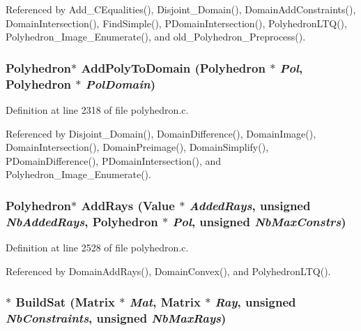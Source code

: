 Referenced by Add\_\-CEqualities(), Disjoint\_\-Domain(), Domain\-Add\-Constraints(), Domain\-Intersection(), Find\-Simple(), PDomain\-Intersection(), Polyhedron\-LTQ(), Polyhedron\_\-Image\_\-Enumerate(), and old\_\-Polyhedron\_\-Preprocess().

\subsubsection{\setlength{\rightskip}{0pt plus 5cm}Polyhedron$\ast$ Add\-Poly\-To\-Domain (Polyhedron $\ast$ {\em Pol}, Polyhedron $\ast$ {\em Pol\-Domain})}\label{polyhedron_8c_a30}




Definition at line 2318 of file polyhedron.c.

Referenced by Disjoint\_\-Domain(), Domain\-Difference(), Domain\-Image(), Domain\-Intersection(), Domain\-Preimage(), Domain\-Simplify(), PDomain\-Difference(), PDomain\-Intersection(), and Polyhedron\_\-Image\_\-Enumerate().

\subsubsection{\setlength{\rightskip}{0pt plus 5cm}Polyhedron$\ast$ Add\-Rays (Value $\ast$ {\em Added\-Rays}, unsigned {\em Nb\-Added\-Rays}, Polyhedron $\ast$ {\em Pol}, unsigned {\em Nb\-Max\-Constrs})}\label{polyhedron_8c_a34}




Definition at line 2528 of file polyhedron.c.

Referenced by Domain\-Add\-Rays(), Domain\-Convex(), and Polyhedron\-LTQ().

\subsubsection{$\ast$ Build\-Sat (Matrix $\ast$ {\em Mat}, Matrix $\ast$ {\em Ray}, unsigned {\em Nb\-Constraints}, unsigned {\em Nb\-Max\-Rays})\hspace{0.3cm}{\tt  [static]}}\label{polyhedron_8c_a27}




